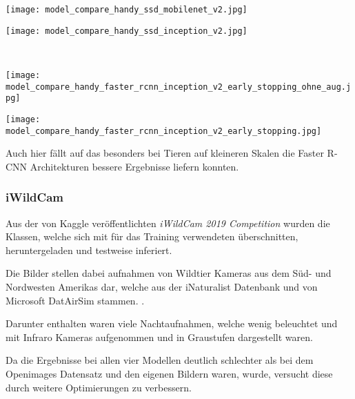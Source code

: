 \vspace{1cm}
\begin{minipage}{0.5\textwidth}
  \centering
  \texttt{[image: model\_compare\_handy\_ssd\_mobilenet\_v2.jpg]}
  \label{fig:infer_res_ssd_mobile}
\end{minipage}
\begin{minipage}{0.5\textwidth}
  \centering
  \texttt{[image: model\_compare\_handy\_ssd\_inception\_v2.jpg]}
  \label{fig:infer_res_ssd_inception}
\end{minipage}
\\[1cm]
\begin{minipage}{0.5\textwidth}
  \centering
  \texttt{[image: model\_compare\_handy\_faster\_rcnn\_inception\_v2\_early\_stopping\_ohne\_aug.jpg]}
  \label{fig:infer_res_rcnn_early_stopping}
\end{minipage}
\begin{minipage}{0.5\textwidth}
  \centering
  \texttt{[image: model\_compare\_handy\_faster\_rcnn\_inception\_v2\_early\_stopping.jpg]}
  \label{fig:infer_rest_rcnn_aug}
\end{minipage}
\vspace{1cm}

Auch hier fällt auf das besonders bei Tieren auf 
kleineren Skalen die Faster R-CNN Architekturen
bessere Ergebnisse liefern konnten.



\subsubsection{iWildCam}

Aus der von Kaggle veröffentlichten \textit{iWildCam 2019 Competition}
wurden die Klassen, welche sich mit für das Training verwendeten  
überschnitten, heruntergeladen und testweise inferiert.

Die Bilder stellen dabei aufnahmen von Wildtier Kameras aus 
dem Süd- und Nordwesten Amerikas dar, welche aus 
der iNaturalist Datenbank und von Microsoft DatAirSim stammen.
\cite{beery2019iwildcam}.

Darunter enthalten waren viele Nachtaufnahmen, welche wenig 
beleuchtet und mit Infraro Kameras aufgenommen und in Graustufen 
dargestellt waren.


Da die Ergebnisse bei allen vier Modellen deutlich schlechter
als bei dem Openimages Datensatz und den eigenen Bildern waren, 
wurde, versucht diese durch weitere Optimierungen zu verbessern.



